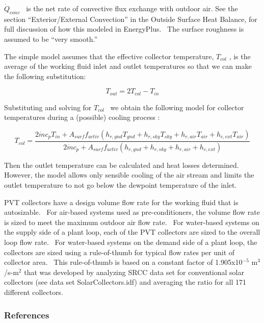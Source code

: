 \({\dot Q_{conv}}\) ~is the net rate of convective flux exchange with outdoor air. See the section ``Exterior/External Convection'' in the Outside Surface Heat Balance, for full discussion of how this modeled in EnergyPlus.~ The surface roughness is assumed to be ``very smooth.''

The simple model assumes that the effective collector temperature, \({T_{col}}\) , is the average of the working fluid inlet and outlet temperatures so that we can make the following substitution:

\begin{equation}
{T_{out}} = 2{T_{col}} - {T_{in}}
\end{equation}

Substituting and solving for \({T_{col}}\) ~we obtain the following model for collector temperatures during a (possible) cooling process :

\begin{equation}
{T_{col}} = \frac{{2\dot m{c_p}{T_{in}} + {A_{surf}}{f_{activ}}\left( {{h_{r,gnd}}{T_{gnd}} + {h_{r,sky}}{T_{sky}} + {h_{r,air}}{T_{air}} + {h_{c,ext}}{T_{air}}} \right)}}{{2\dot m{c_p} + {A_{surf}}{f_{activ}}\left( {{h_{r,gnd}} + {h_{r,sky}} + {h_{r,air}} + {h_{c,ext}}} \right)}}
\end{equation}

Then the outlet temperature can be calculated and heat losses determined.~ However, the model allows only sensible cooling of the air stream and limits the outlet temperature to not go below the dewpoint temperature of the inlet.

PVT collectors have a design volume flow rate for the working fluid that is autosizable.~ For air-based systems used as pre-conditioners, the volume flow rate is sized to meet the maximum outdoor air flow rate.~ For water-based systems on the supply side of a plant loop, each of the PVT collectors are sized to the overall loop flow rate.~ For water-based systems on the demand side of a plant loop, the collectors are sized using a rule-of-thumb for typical flow rates per unit of collector area.~ This rule-of-thumb is based on a constant factor of 1.905x10\(^{-5}\) m\(^{3}\)/s-m\(^{2}\) that was developed by analyzing SRCC data set for conventional solar collectors (see data set SolarCollectors.idf) and averaging the ratio for all 171 different collectors.

\subsubsection{References}\label{references-2-008}

